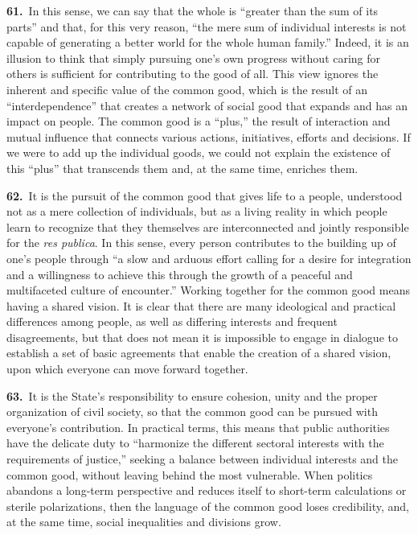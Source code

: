 \documentclass{article}
\begin{document}
\textbf{61.}\ In this sense, we can say that the whole is ``greater than the sum of its parts''\cite{n78} and that, for this very reason, ``the mere sum of individual interests is not capable of generating a better world for the whole human family.''\cite{n79} Indeed, it is an illusion to think that simply pursuing one's own progress without caring for others is sufficient for contributing to the good of all. This view ignores the inherent and specific value of the common good, which is the result of an ``interdependence''\cite{n80} that creates a network of social good that expands and has an impact on people. The common good is a ``plus,'' the result of interaction and mutual influence that connects various actions, initiatives, efforts and decisions. If we were to add up the individual goods, we could not explain the existence of this ``plus'' that transcends them and, at the same time, enriches them.

\textbf{62.}\ It is the pursuit of the common good that gives life to a people, understood not as a mere collection of individuals, but as a living reality in which people learn to recognize that they themselves are interconnected and jointly responsible for the \emph{res publica}. In this sense, every person contributes to the building up of one's people through ``a slow and arduous effort calling for a desire for integration and a willingness to achieve this through the growth of a peaceful and multifaceted culture of encounter.''\cite{n81} Working together for the common good means having a shared vision. It is clear that there are many ideological and practical differences among people, as well as differing interests and frequent disagreements, but that does not mean it is impossible to engage in dialogue to establish a set of basic agreements that enable the creation of a shared vision, upon which everyone can move forward together.

\textbf{63.}\ It is the State's responsibility to ensure cohesion, unity and the proper organization of civil society, so that the common good can be pursued with everyone's contribution. In practical terms, this means that public authorities have the delicate duty to ``harmonize the different sectoral interests with the requirements of justice,''\cite{n82} seeking a balance between individual interests and the common good, without leaving behind the most vulnerable. When politics abandons a long-term perspective and reduces itself to short-term calculations or sterile polarizations, then the language of the common good loses credibility, and, at the same time, social inequalities and divisions grow.
\end{document}
